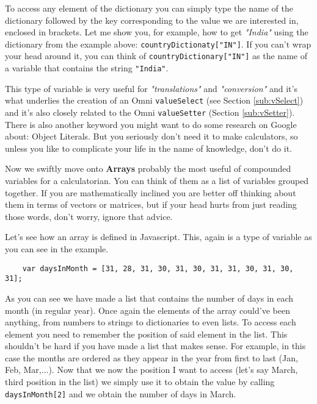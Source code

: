 To access any element of the dictionary you can simply type the name of the dictionary followed by the key corresponding to the value we are interested in, enclosed in brackets. Let me show you, for example, how to get \textit{"India"} using the dictionary from the example above: \texttt{countryDictionaty["IN"]}. If you can't wrap your head around it, you can think of \texttt{countryDictionary["IN"]} as the name of a variable that contains the string \texttt{"India"}.

This type of variable is very useful for \textit{"translations"} and \textit{"conversion"} and it's what underlies the creation of an Omni \texttt{valueSelect} (see Section \ref{sub:vSelect}) and it's also closely related to the Omni \texttt{valueSetter} (Section \ref{sub:vSetter}). There is also another keyword you might want to do some research on Google about: Object Literals. But you seriously don't need it to make calculators, so unless you like to complicate your life in the name of knowledge, don't do it.

Now we swiftly move onto \textbf{Arrays} probably the most useful of compounded variables for a calculatorian. You can think of them as a list of variables grouped together. If you are mathematically inclined you are better off thinking about them in terms of vectors or matrices, but if your head hurts from just reading those words, don't worry, ignore that advice.

Let's see how an array is defined in Javascript. This, again is a type of variable as you can see in the example. 

\begin{lstlisting}
    var daysInMonth = [31, 28, 31, 30, 31, 30, 31, 31, 30, 31, 30, 31];
\end{lstlisting}

As you can see we have made a list that contains the number of days in each month (in regular year). Once again the elements of the array could've been anything, from numbers to strings to dictionaries to even lists. To access each element you need to remember the position of said element in the list. This shouldn't be hard if you have made a list that makes sense. For example, in this case the months are ordered as they appear in the year from first to last (Jan, Feb, Mar,...). Now that we now the position I want to access (let's say March, third position in the list) we simply use it to obtain the value by calling \texttt{daysInMonth[2]} and we obtain the number of days in March.


